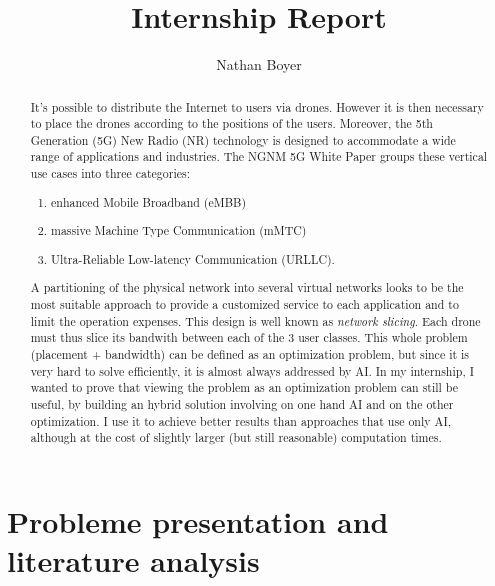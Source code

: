 \documentclass[letterpaper]{article}
\title{Internship Report}
\author{Nathan Boyer}
\begin{document}
\maketitle

\begin{abstract}

    It's possible to distribute the Internet to users via drones.
    However it is then necessary to place the drones according to the positions of the users.
    Moreover, the 5th Generation (5G) New Radio (NR) technology is designed to accommodate a wide range of applications and industries. The NGNM 5G White Paper \cite{5gwhitepaper} groups these vertical use cases into three categories:
    \begin{enumerate}
        \item enhanced Mobile Broadband (eMBB)
        \item massive Machine Type Communication (mMTC)
        \item Ultra-Reliable Low-latency Communication (URLLC).
    \end{enumerate}

    A partitioning of the physical network into several virtual networks looks to be the most suitable approach to provide a customized service to each application and to limit the operation expenses. This design is well known as \textit{network slicing}.
    Each drone must thus slice its bandwith between each of the 3 user classes.
    This whole problem (placement + bandwidth) can be defined as an optimization problem, but since it is very hard to solve efficiently, it is almost always addressed by AI.
    In my internship, I wanted to prove that viewing the problem as an optimization problem can still be useful, by building an hybrid solution involving on one hand AI and on the other optimization.
    I use it to achieve better results than approaches that use only AI, although at the cost of slightly larger (but still reasonable) computation times.
\end{abstract}


\tableofcontents


\section{Probleme presentation and literature analysis}
\end{document}
